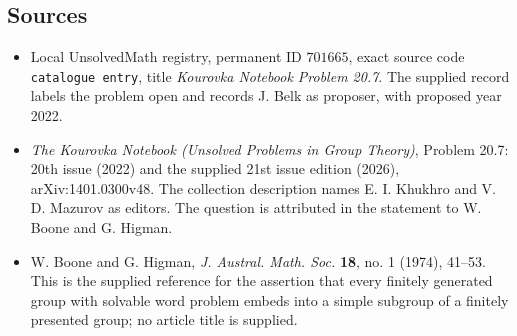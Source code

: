 \documentclass[11pt]{article}
\begin{document}
\subsection{Sources}
\begin{itemize}
\item Local UnsolvedMath registry, permanent ID \(701665\), exact source code \texttt{catalogue entry}, title \emph{Kourovka Notebook Problem 20.7}. The supplied record labels the problem open and records J. Belk as proposer, with proposed year 2022.
\item \emph{The Kourovka Notebook (Unsolved Problems in Group Theory)}, Problem 20.7: 20th issue (2022) and the supplied 21st issue edition (2026), arXiv:1401.0300v48. The collection description names E. I. Khukhro and V. D. Mazurov as editors. The question is attributed in the statement to W. Boone and G. Higman.
\item W. Boone and G. Higman, \emph{J. Austral. Math. Soc.} \textbf{18}, no. 1 (1974), 41--53. This is the supplied reference for the assertion that every finitely generated group with solvable word problem embeds into a simple subgroup of a finitely presented group; no article title is supplied.
\end{itemize}
\end{document}
